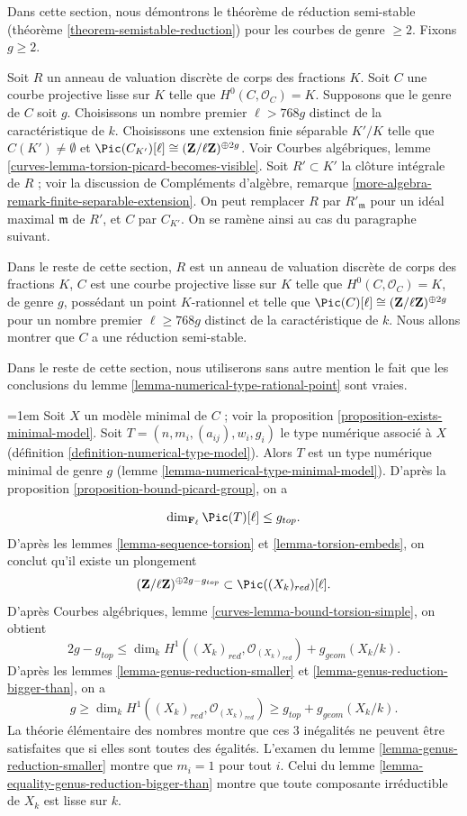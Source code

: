 \noindent
Dans cette section, nous démontrons le théorème de réduction semi-stable
(théorème \ref{theorem-semistable-reduction}) pour les courbes de genre
$\geq2$. Fixons $g\geq2$.

\medskip\noindent
Soit $R$ un anneau de valuation discrète de corps des fractions $K$.
Soit $C$ une courbe projective lisse sur $K$ telle que
$H^0(C,\mathcal{O}_C)=K$. Supposons que le genre de $C$ soit $g$.
Choisissons un nombre premier $\ell>768g$ distinct de la caractéristique de
$k$. Choisissons une extension finie séparable $K'/K$ telle que
$C(K') \not = \emptyset$ et
$\Pic(C_{K'})[\ell]\cong(\mathbf{Z}/\ell\mathbf{Z})^{\oplus2g}$.
Voir Courbes algébriques, lemme
\ref{curves-lemma-torsion-picard-becomes-visible}. Soit $R'\subset K'$ la
clôture intégrale de $R$ ; voir la discussion de Compléments d'algèbre,
remarque \ref{more-algebra-remark-finite-separable-extension}. On peut
remplacer $R$ par $R'_{\mathfrak m}$ pour un idéal maximal $\mathfrak m$
de $R'$, et $C$ par $C_{K'}$. On se ramène ainsi au cas du paragraphe
suivant.

\medskip\noindent
Dans le reste de cette section, $R$ est un anneau de valuation discrète de
corps des fractions $K$, $C$ est une courbe projective lisse sur $K$ telle
que $H^0(C,\mathcal{O}_C)=K$, de genre $g$, possédant un point
$K$-rationnel et telle que
$\Pic(C)[\ell]\cong(\mathbf{Z}/\ell\mathbf{Z})^{\oplus2g}$ pour un nombre
premier $\ell\geq768g$ distinct de la caractéristique de $k$. Nous allons
montrer que $C$ a une réduction semi-stable.

\medskip\noindent
Dans le reste de cette section, nous utiliserons sans autre mention le fait
que les conclusions du lemme \ref{lemma-numerical-type-rational-point}
sont vraies.

\medskip\noindent
\begingroup
\emergencystretch=1em
Soit $X$ un modèle minimal de $C$ ; voir la proposition
\ref{proposition-exists-minimal-model}. Soit
$T=(n,\allowbreak{}m_i,\allowbreak{}(a_{ij}),\allowbreak{}w_i,\allowbreak{}g_i)$ le type numérique associé à $X$
(définition \ref{definition-numerical-type-model}). Alors $T$ est un type
numérique minimal de genre $g$ (lemme
\ref{lemma-numerical-type-minimal-model}). D'après la proposition
\ref{proposition-bound-picard-group}, on a
\par
\endgroup
$$
\dim_{\mathbf{F}_\ell} \Pic(T)[\ell] \leq g_{top}.
$$
D'après les lemmes \ref{lemma-sequence-torsion} et
\ref{lemma-torsion-embeds}, on conclut qu'il existe un plongement
$$
(\mathbf{Z}/\ell \mathbf{Z})^{\oplus 2g - g_{top}}
\subset \Pic((X_k)_{red})[\ell].
$$
D'après Courbes algébriques, lemme
\ref{curves-lemma-bound-torsion-simple}, on obtient
$$
2g - g_{top} \leq
\dim_k H^1((X_k)_{red}, \mathcal{O}_{(X_k)_{red}}) + g_{geom}(X_k/k).
$$
D'après les lemmes \ref{lemma-genus-reduction-smaller} et
\ref{lemma-genus-reduction-bigger-than}, on a
$$
g \geq \dim_k H^1((X_k)_{red}, \mathcal{O}_{(X_k)_{red}}) \geq
g_{top} + g_{geom}(X_k/k).
$$
La théorie élémentaire des nombres montre que ces $3$ inégalités ne
peuvent être satisfaites que si elles sont toutes des égalités.
L'examen du lemme \ref{lemma-genus-reduction-smaller} montre que
$m_i=1$ pour tout $i$. Celui du lemme
\ref{lemma-equality-genus-reduction-bigger-than} montre que toute composante
irréductible de $X_k$ est lisse sur $k$.

